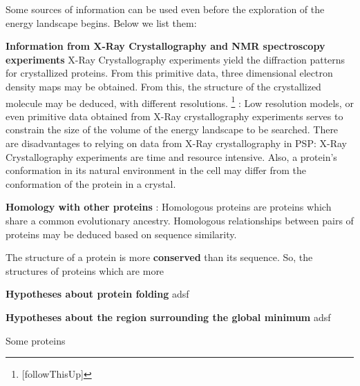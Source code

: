 \documentclass[10pt]{report}
\newcommand{\headedlist}{
   \begin{list}{}{}}
\newcommand{\headeditem}[1]{
    \item\textbf{#1}  }
\newcommand{\headedlistend}{
    \end{list}  }
\begin{document}
Some sources of information can be used even before the exploration of the energy landscape begins. Below we list them:

\headedlist
 \headeditem{Information from X-Ray Crystallography and NMR spectroscopy experiments}
 \subitem X-Ray Crystallography experiments yield the diffraction patterns for crystallized proteins. From this primitive data, three dimensional electron density maps may be obtained. From this, the structure of the crystallized molecule may be deduced, with different resolutions. \footnote{[followThisUp]}
 : Low resolution models, or even primitive data obtained from X-Ray crystallography experiments serves to constrain the size of the volume of the energy landscape to be searched. There are disadvantages to relying on data from X-Ray crystallography in PSP: X-Ray Crystallography experiments are time and resource intensive. Also, a protein's conformation in its natural environment in the cell may differ from the conformation of the protein in a crystal.

 \headeditem{Homology with other proteins}: Homologous proteins are proteins which share a common evolutionary ancestry. Homologous relationships between pairs of proteins may be deduced based on sequence similarity.

The structure of a protein is more \textbf{conserved} than its sequence. So, the structures of proteins which are more 

 \headeditem{Hypotheses about protein folding}
 \subitem adsf

 \headeditem{Hypotheses about the region surrounding the global minimum}
 \subitem adsf

Some proteins

\headedlistend
\end{document}

